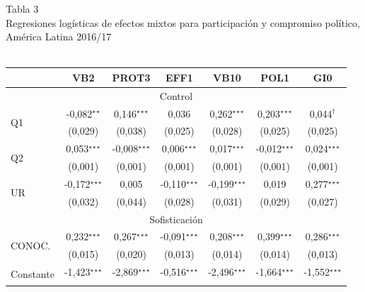 \documentclass[a4paper]{tufte-handout}
\begin{document}
\begin{table}[h]
  \centering
  \selectfont
   \smallskip\noindent\small Tabla 3 \\ Regresiones logísticas de efectos mixtos para participación y compromiso político, América Latina 2016/17 \\~\\
  \begin{tabular}{l c c c c c c}
    \toprule
     & VB2 & PROT3 & EFF1 & VB10 & POL1 & GI0 \\ \midrule
    \multicolumn{7}{c}{Control} \\ \midrule
    \multirow{2}{*}{Q1} & -0,082$^\star$$^\star$ & 0,146$^\star$$^\star$$^\star$ & 0,036 & 0,262$^\star$$^\star$$^\star$ & 0,203$^\star$$^\star$$^\star$ & 0,044$^\dagger$ \\
    & {\scriptsize (0,029)} & {\scriptsize (0,038)} & {\scriptsize (0,025)} & {\scriptsize (0,028)} & {\scriptsize (0,025)} & {\scriptsize (0,025)} \\ 
    \multirow{2}{*}{Q2} & 0,053$^\star$$^\star$$^\star$ & -0,008$^\star$$^\star$$^\star$ & 0,006$^\star$$^\star$$^\star$ & 0,017$^\star$$^\star$$^\star$ & -0,012$^\star$$^\star$$^\star$ & 0,024$^\star$$^\star$$^\star$ \\
    & {\scriptsize (0,001)} & {\scriptsize (0,001)} & {\scriptsize (0,001)} & {\scriptsize (0,001)} & {\scriptsize (0,001)} & {\scriptsize (0,001)} \\
    \multirow{2}{*}{UR} & -0,172$^\star$$^\star$$^\star$ & 0,005 & -0,110$^\star$$^\star$$^\star$ & -0,199$^\star$$^\star$$^\star$ & 0,019 & 0,277$^\star$$^\star$$^\star$ \\
    & {\scriptsize (0,032)} & {\scriptsize (0,044)} & {\scriptsize (0,028)} & {\scriptsize (0,031)} & {\scriptsize (0,029)} & {\scriptsize (0,027)} \\ \midrule
    \multicolumn{7}{c}{Sofisticación} \\ \midrule
    \multirow{2}{*}{CONOC.} & 0,232$^\star$$^\star$$^\star$ & 0,267$^\star$$^\star$$^\star$ & -0,091$^\star$$^\star$$^\star$ & 0,208$^\star$$^\star$$^\star$ & 0,399$^\star$$^\star$$^\star$ & 0,286$^\star$$^\star$$^\star$ \\
    & {\scriptsize (0,015)} & {\scriptsize (0,020)} & {\scriptsize (0,013)} & {\scriptsize (0,014)} & {\scriptsize (0,014)} & {\scriptsize (0,013)} \\ \midrule
    \multirow{2}{*}{Constante} & -1,423$^\star$$^\star$$^\star$ & -2,869$^\star$$^\star$$^\star$ & -0,516$^\star$$^\star$$^\star$ & -2,496$^\star$$^\star$$^\star$ & -1,664$^\star$$^\star$$^\star$ & -1,552$^\star$$^\star$$^\star$ \\
$$
\end{tabular}
\end{table}
\end{document}
